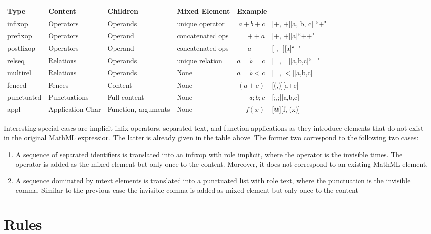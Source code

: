 \documentclass{article}
\begin{document}
\noindent
\begin{tabular}{l||l|l|l||r@{$\quad\longrightarrow\quad$}l}
  Type & Content & Children & Mixed Element & \multicolumn{2}{l}{Example}\\\hline
  infixop & Operators & Operands & unique operator & $a+b+c$ &  [+, +][a, b, c] ``+" \\
  prefixop & Operators & Operand & concatenated ops & $++a$ & [+, +][a]``++" \\ 
  postfixop & Operators & Operand & concatenated ops & $a--$ & [-, -][a]``--" \\ 
  relseq & Relations & Operands & unique relation & $a=b=c$ & [=, =][a,b,c]``=" \\ 
  multirel & Relations & Operands & None & $a=b<c$ & [=, $<$][a,b,c] \\ 
  fenced & Fences & Content & None & $(a + c)$ & [(,)][a+c]\\
  punctuated & Punctuations & Full content & None & $a;b;c$ & [;,;][a,b,c]\\
  appl & Application Char & Function, arguments & None & $f(x)$ & [@][f, (x)]\\
\end{tabular}


Interesting special cases are implicit infix operators, separated text, and
function applications as they introduce elements that do not exist in the
original MathML expression. The latter is already given in the table above. The
former two correspond to the following two cases:

\begin{enumerate}
\item A sequence of separated identifiers is translated into an infixop with
  role implicit, where the operator is the invisible times. The operator is
  added as the mixed element but only once to the content. Moreover, it does not
  correspond to an existing MathML element.
\item A sequence dominated by mtext elements is translated into a punctuated
  list with role text, where the punctuation is the invisible comma. Similar to
  the previous case the invisible comma is added as mixed element but only once
  to the content.
\end{enumerate}



\section{Rules}\label{sec:rules}
\end{document}
